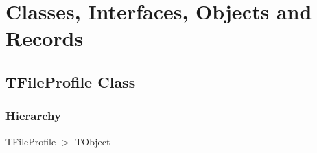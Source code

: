 \documentclass{report}
\newif\ifpdf
\begin{document}
\section{Classes, Interfaces, Objects and Records}
\ifpdf
\subsection*{\large{\textbf{TFileProfile Class}}\normalsize\hspace{1ex}\hrulefill}
\else
\subsection*{TFileProfile Class}
\fi
\label{editor.TFileProfile}
\subsubsection*{\large{\textbf{Hierarchy}}\normalsize\hspace{1ex}\hfill}
TFileProfile {$>$} TObject
\end{document}
